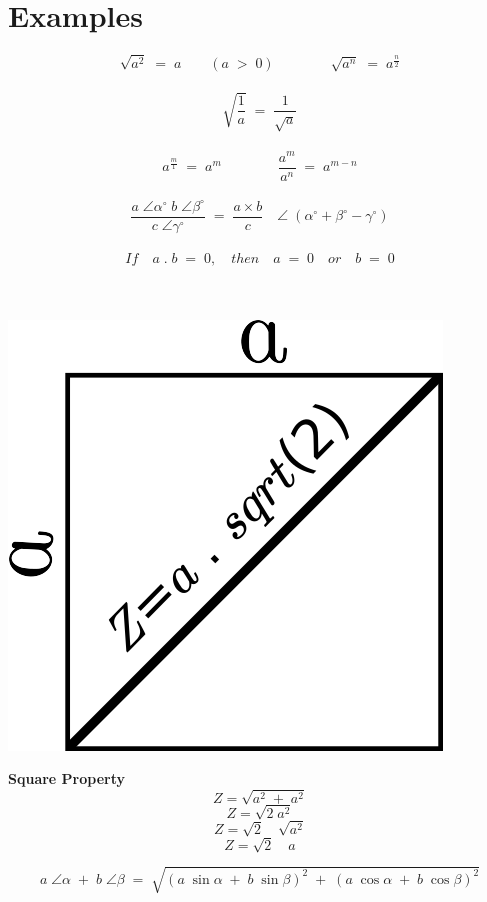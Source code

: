 \section{Examples}

\[\sqrt{a^2} \; = \; a \qquad (a \; > \; 0) \qquad \qquad \sqrt{a^n} \; = \; a^{\frac{n}{2}}\] \\
\[\sqrt{\frac{1}{a}} \; = \; \frac{1}{\sqrt{a}}\] \\
\[a^{\frac{m}{1}} \; = \; a^m \qquad \qquad \frac{a^m}{a^n} \; = \; a^{m-n}\] \\
\[\frac{a \; \angle \alpha^\circ \; b \; \angle \beta^\circ}{c \; \angle \gamma^\circ} \; = \; \frac{a \times b}{c} \quad \angle \; (\alpha^\circ + \beta^\circ - \gamma^\circ)\]
\\
\[If \quad a \; . \; b \; = \; 0, \quad then \quad a \; = \; 0 \quad or \quad b \; = \; 0\]
\\
\\
\begin{minipage}{0.60\linewidth}
	\includegraphics[scale=0.5]{./image/squareproperty.png}
\end{minipage}
\begin{minipage}[H]{0.3\linewidth}
	\textbf{Square Property} \\
	\[Z=\sqrt{a^2 \; + \; a^2}\]
	\[Z=\sqrt{2 \; a^2}\]
	\[Z=\sqrt{2} \quad \sqrt{a^2}\]
	\[Z=\sqrt{2} \quad a\]
\end{minipage}
\vspace{1cm}
\[a \; \angle \alpha \; + \; b \; \angle \beta \; = \; \sqrt{(a \;  \sin \alpha \; + \; b \; \sin \beta)^2 \; + \; (a \; \cos \alpha \; + \; b \; \cos \beta)^2}\] \\
